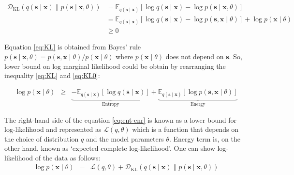 \begin{align}
    \mathcal{D}_{\mathrm{KL}}\left( q\left(\boldsymbol{s}\mid \boldsymbol{x}\right) \| p\left(\boldsymbol{s}\mid \boldsymbol{x},\theta \right)\right) &=\mathbb{E}_{q\left(\boldsymbol{s}\mid\boldsymbol{x}\right)} \left[\log q\left(\boldsymbol{s}\mid\boldsymbol{x}\right) - \log p\left(\boldsymbol{s}\mid\boldsymbol{x}, \theta \right)\right] \\
    &=\mathbb{E}_{q\left(\boldsymbol{s}\mid\boldsymbol{x}\right)} \left[\log q\left(\boldsymbol{s}\mid\boldsymbol{x}\right) - \log p\left(\boldsymbol{s},\boldsymbol{x}\mid\theta \right)\right]
    + \log p\left(\boldsymbol{x}\mid\theta \right) \label{eq:KL}\\
    &\geq 0  \label{eq:KL0}
\end{align}

Equation \ref{eq:KL} is obtained from Bayes' rule $p\left(\boldsymbol{s}\mid\boldsymbol{x},\theta \right) = p\left(\boldsymbol{s}, \boldsymbol{x}\mid \theta \right) / p\left(\boldsymbol{x}\mid \theta \right)$ where $p\left(\boldsymbol{x}\mid \theta \right)$ does not depend on $\boldsymbol{s}$. So, lower bound on log marginal likelihood could be obtain by rearranging the inequality \ref{eq:KL} and \ref{eq:KL0}:

\begin{eqnarray}
    \log p\left(\boldsymbol{x} \mid \theta \right) &\geq& \underbrace{-\mathbb{E}_{q\left(\boldsymbol{s}\mid\boldsymbol{x}\right)} \left[\log  q \left(\boldsymbol{s}\mid\boldsymbol{x}\right) \right]}_{\text { Entropy }}
    +\underbrace{\mathbb{E}_{q\left(\boldsymbol{s}\mid\boldsymbol{x}\right)} \left[\log p\left(\boldsymbol{s},\boldsymbol{x}\mid\theta \right)\right]}_{\text { Energy }} \label{eq:ent-enr}
\end{eqnarray}

The right-hand side of the equation \ref{eq:ent-enr} is known as a lower bound for log-likelihood and represented as $\mathcal{L}(q, \theta)$ which is a function that depends on the choice of distribution $q$ and the model parameters $\theta$. Energy term is, on the other hand, known as `expected complete log-likelihood'\cite{barber2011bayesian}. 
One can show log-likelihood of the data as follows:
\begin{eqnarray}
    \log p\left(\boldsymbol{x} \mid \theta\right)&=&\mathcal{L}\left(q, \theta\right) + \mathcal{D}_{\mathrm{KL}}\left( q\left(\boldsymbol{s}\mid \boldsymbol{x}\right) \| p\left(\boldsymbol{s}\mid \boldsymbol{x},\theta \right)\right) \label{eq:loglik}
\end{eqnarray}

